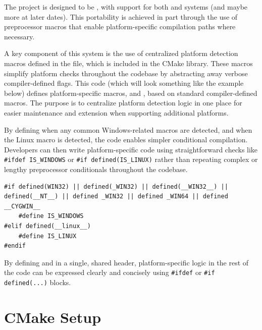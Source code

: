 The  project is designed to be , with support for both  and  systems (and maybe more at later dates). This portability is achieved in part through the use of preprocessor macros that enable platform-specific compilation paths where necessary.

A key component of this system is the use of centralized platform detection macros defined in the  file, which is included in the  CMake library. These macros simplify platform checks throughout the codebase by abstracting away verbose compiler-defined flags. This code (which will look something like the example below) defines platform-specific macros,  and , based on standard compiler-defined macros. The purpose is to centralize platform detection logic in one place for easier maintenance and extension when supporting additional platforms.

By defining  when any common Windows-related macros are detected, and  when the Linux macro  is detected, the code enables simpler conditional compilation. Developers can then write platform-specific code using straightforward checks like \texttt{\#ifdef IS\_WINDOWS} or \texttt{\#if defined(IS\_LINUX)} rather than repeating complex or lengthy preprocessor conditionals throughout the codebase.
\begin{lstlisting}[style=cppstyle]
#if defined(WIN32) || defined(_WIN32) || defined(__WIN32__) || defined(__NT__) || defined _WIN32 || defined _WIN64 || defined __CYGWIN__
	#define IS_WINDOWS
#elif defined(__linux__)
	#define IS_LINUX
#endif
\end{lstlisting}
By defining  and  in a single, shared header, platform-specific logic in the rest of the code can be expressed clearly and concisely using \texttt{\#ifdef} or \texttt{\#if defined(...)} blocks.















\section{CMake Setup}\label{section:cmake_setup}

